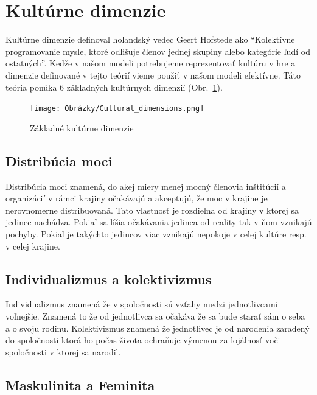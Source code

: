 \documentclass[10pt,twoside,slovak,a4paper]{article}
\begin{document}
\section{Kultúrne dimenzie}\label{kultura} 

Kultúrne dimenzie definoval holandský vedec Geert Hofstede ako \cite{hofstede2010cultures}
``Kolektívne programovanie mysle, ktoré odlišuje členov jednej skupiny alebo kategórie ľudí
od ostatných''. Keďže v našom modeli potrebujeme reprezentovať kultúru v hre a dimenzie definované
v tejto teórií vieme použiť v našom modeli efektívne. Táto teória \cite{hall1966the} ponúka 6
základných kultúrnych dimenzií (Obr.~\ref{fig:culture}).

\begin{figure}[H]
	\centering
	\texttt{[image: Obrázky/Cultural\_dimensions.png]}
	\caption{Základné kultúrne dimenzie~\cite{hofstede2010cultures}}
	\label{fig:culture}
\end{figure}

\subsection{Distribúcia moci}\label{kultura:moc}

Distribúcia moci znamená, do akej miery menej mocný členovia inštitúcií a organizácií v
rámci krajiny očakávajú a akceptujú, že moc v krajine je nerovnomerne distribuovaná. Tato
vlastnosť je rozdielna od krajiny v ktorej sa jedinec nachádza. Pokiaľ sa líšia očakávania
jedinca od reality tak v ňom vznikajú pochyby. Pokiaľ je takýchto jedincov viac vznikajú
nepokoje v celej kultúre resp. v celej krajine.

\subsection{Individualizmus a kolektivizmus}\label{kultura:etika}

Individualizmus znamená že v spoločnosti sú vzťahy medzi jednotlivcami voľnejšie. Znamená
to že od jednotlivca sa očakáva že sa bude starať sám o seba a o svoju rodinu. Kolektivizmus
znamená že jednotlivec je od narodenia zaradený do spoločnosti ktorá ho počas života ochraňuje
výmenou za lojálnosť voči spoločnosti v ktorej sa narodil.

\subsection{Maskulinita a Feminita}\label{kultura:masfem}
\end{document}
